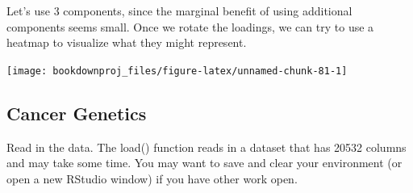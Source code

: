 \documentclass[
]{article}
\newenvironment{Shaded}{\begin{snugshade}}{\end{snugshade}}
\newcommand{\AttributeTok}[1]{\textcolor[rgb]{0.77,0.63,0.00}{#1}}
\newcommand{\DecValTok}[1]{\textcolor[rgb]{0.00,0.00,0.81}{#1}}
\newcommand{\FunctionTok}[1]{\textcolor[rgb]{0.00,0.00,0.00}{#1}}
\newcommand{\NormalTok}[1]{#1}
\newcommand{\OtherTok}[1]{\textcolor[rgb]{0.56,0.35,0.01}{#1}}
\newcommand{\SpecialCharTok}[1]{\textcolor[rgb]{0.00,0.00,0.00}{#1}}
\newcommand{\StringTok}[1]{\textcolor[rgb]{0.31,0.60,0.02}{#1}}
\theoremstyle{definition}
\theoremstyle{definition}
\theoremstyle{definition}
\theoremstyle{definition}
\theoremstyle{remark}
\begin{document}
Let's use 3 components, since the marginal benefit of using additional components seems small. Once we rotate the loadings, we can try to use a heatmap to visualize what they might represent.

\begin{Shaded}
\end{Shaded}

\begin{center}\texttt{[image: bookdownproj\_files/figure-latex/unnamed-chunk-81-1]} \end{center}

\hypertarget{cancer-genetics}{%
\subsection{Cancer Genetics}\label{cancer-genetics}}

Read in the data. The load() function reads in a dataset that has 20532 columns and may take some time. You may want to save and clear your environment (or open a new RStudio window) if you have other work open.

\begin{Shaded}
\end{Shaded}
\end{document}
